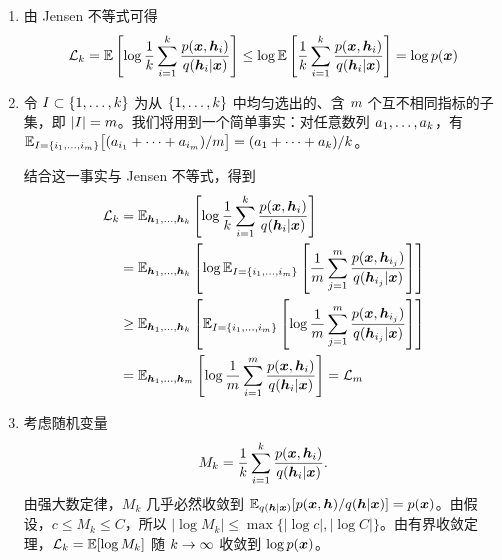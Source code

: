 \begin{enumerate}
\item
由 Jensen 不等式可得
\begin{equation}
\mathcal{L}_{k}=\mathbb{E}\left[\log \frac{1}{k} \sum_{i=1}^k \frac{p(\bm{x},\bm{h}_{i})}{q(\bm{h}_{i}|\bm{x})}  \right]\leq \log \mathbb{E}\left[\frac{1}{k} \sum_{i=1}^k \frac{p(\bm{x},\bm{h}_{i})}{q(\bm{h}_{i}|\bm{x})}  \right]=\log p(\bm{x})\label{eq:source-16}
\end{equation}
\item 令 $I\subset\{1,\ldots,k\}$ 为从 $\{1,\ldots,k\}$ 中均匀选出的、含 $m$ 个互不相同指标的子集，即 $|I|=m$。我们将用到一个简单事实：对任意数列 $a_1,\ldots,a_k$，有 $\mathbb{E}_{I=\{i_1,\ldots,i_m\}}\bigl[(a_{i_1}+\cdots+a_{i_m})/m\bigr]=(a_1+\cdots+a_k)/k$。

结合这一事实与 Jensen 不等式，得到
\begin{align}
\mathcal{L}_{k} &= \mathbb{E}_{\bm{h}_{1},\ldots,\bm{h}_{k}} \left[ \log \frac{1}{k} \sum_{i=1}^k \frac{p(\bm{x},\bm{h}_{i})}{q(\bm{h}_{i}|\bm{x})} \right]\label{eq:source-17}
\\
&= \mathbb{E}_{\bm{h}_{1},\ldots,\bm{h}_{k}} \left[ \log\mathbb{E}_{I=\{i_1,\ldots,i_m\}}\left[\frac{1}{m} \sum_{j=1}^m \frac{p(\bm{x},\bm{h}_{i_j})}{q(\bm{h}_{i_j}|\bm{x})} \right] \right]\label{eq:source-18}
\\
& \geq \mathbb{E}_{\bm{h}_{1},\ldots,\bm{h}_{k}} \left[ \mathbb{E}_{I=\{i_1,\ldots,i_m\}} \left[ \log \frac{1}{m} \sum_{j=1}^m \frac{p(\bm{x},\bm{h}_{i_j})}{q(\bm{h}_{i_j}|\bm{x})} \right] \right]\label{eq:source-19}
\\
&=\mathbb{E}_{\bm{h}_{1},\ldots,\bm{h}_{m}}\left[\log \frac{1}{m} \sum_{i=1}^m \frac{p(\bm{x},\bm{h}_{i})}{q(\bm{h}_{i}|\bm{x})} \right]=\mathcal{L}_{m}\label{eq:source-20}
\end{align}
\item 考虑随机变量
\[M_k=\frac{1}{k}\sum_{i=1}^{k}\frac{p(\bm{x},\bm{h}_{i})}{q(\bm{h}_{i}|\bm{x})}.\]
由强大数定律，$M_k$ 几乎必然收敛到 $\mathbb{E}_{q(\bm{h}|\bm{x})}[p(\bm{x},\bm{h})/q(\bm{h}|\bm{x})]=p(\bm{x})$。由假设，$c\leq M_k\leq C$，所以 $|\log M_k|\leq\max\{|\log c|,|\log C|\}$。由有界收敛定理，$\mathcal{L}_{k}=\mathbb{E}[\log M_k]$ 随 $k\to\infty$ 收敛到 $\log p(\bm{x})$。
\end{enumerate}
